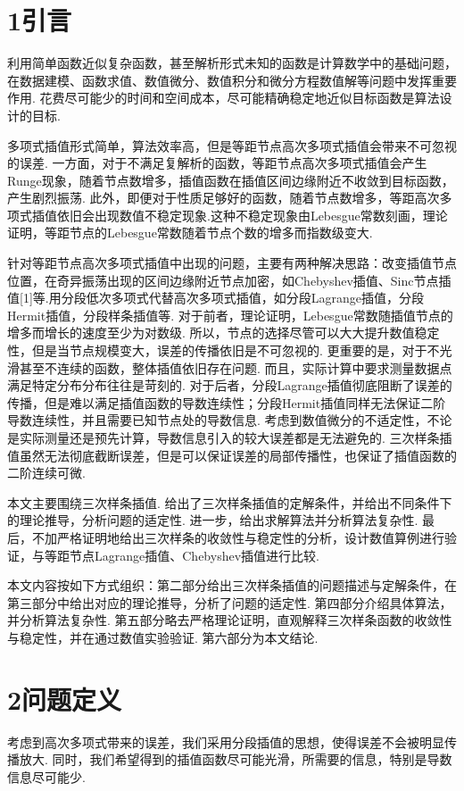 \documentclass[12pt]{article}
\begin{document}
\section*{{\large\bf 1}\quad\large\heiti  引言}	
\par 利用简单函数近似复杂函数，甚至解析形式未知的函数是计算数学中的基础问题，在数据建模、函数求值、数值微分、数值积分和微分方程数值解等问题中发挥重要作用. 花费尽可能少的时间和空间成本，尽可能精确稳定地近似目标函数是算法设计的目标.
\par 多项式插值形式简单，算法效率高，但是等距节点高次多项式插值会带来不可忽视的误差. 一方面，对于不满足复解析的函数，等距节点高次多项式插值会产生Runge现象，随着节点数增多，插值函数在插值区间边缘附近不收敛到目标函数，产生剧烈振荡. 此外，即便对于性质足够好的函数，随着节点数增多，等距高次多项式插值依旧会出现数值不稳定现象.这种不稳定现象由Lebesgue常数刻画，理论证明，等距节点的Lebesgue常数随着节点个数的增多而指数级变大. 
\par 针对等距节点高次多项式插值中出现的问题，主要有两种解决思路：改变插值节点位置，在奇异振荡出现的区间边缘附近节点加密，如Chebyshev插值、Sinc节点插值[1]等.用分段低次多项式代替高次多项式插值，如分段Lagrange插值，分段Hermit插值，分段样条插值等. 对于前者，理论证明，Lebesgue常数随插值节点的增多而增长的速度至少为对数级. 所以，节点的选择尽管可以大大提升数值稳定性，但是当节点规模变大，误差的传播依旧是不可忽视的. 更重要的是，对于不光滑甚至不连续的函数，整体插值依旧存在问题. 而且，实际计算中要求测量数据点满足特定分布分布往往是苛刻的. 对于后者，分段Lagrange插值彻底阻断了误差的传播，但是难以满足插值函数的导数连续性；分段Hermit插值同样无法保证二阶导数连续性，并且需要已知节点处的导数信息. 考虑到数值微分的不适定性，不论是实际测量还是预先计算，导数信息引入的较大误差都是无法避免的. 三次样条插值虽然无法彻底截断误差，但是可以保证误差的局部传播性，也保证了插值函数的二阶连续可微.
\par 本文主要围绕三次样条插值. 给出了三次样条插值的定解条件，并给出不同条件下的理论推导，分析问题的适定性. 进一步，给出求解算法并分析算法复杂性. 最后，不加严格证明地给出三次样条的收敛性与稳定性的分析，设计数值算例进行验证，与等距节点Lagrange插值、Chebyshev插值进行比较. 
\par 本文内容按如下方式组织：第二部分给出三次样条插值的问题描述与定解条件，在第三部分中给出对应的理论推导，分析了问题的适定性. 第四部分介绍具体算法，并分析算法复杂性. 第五部分略去严格理论证明，直观解释三次样条函数的收敛性与稳定性，并在通过数值实验验证. 第六部分为本文结论.

\section*{{\large\bf 2}\quad\large\heiti  问题定义}
\par 考虑到高次多项式带来的误差，我们采用分段插值的思想，使得误差不会被明显传播放大. 同时，我们希望得到的插值函数尽可能光滑，所需要的信息，特别是导数信息尽可能少.
\end{document}
